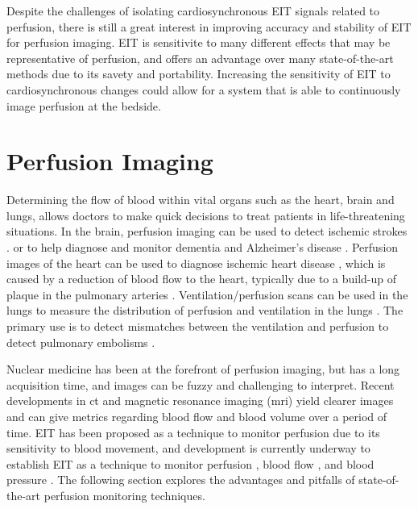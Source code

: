 Despite the challenges of isolating cardiosynchronous EIT signals related to 
perfusion, there is still a great interest in 
improving accuracy and stability of EIT for perfusion imaging.
EIT is sensitivite to many different effects that may be representative of 
perfusion, and offers an advantage over many  
state-of-the-art methods due to its savety and portability. 
Increasing the sensitivity of EIT to cardiosynchronous changes could
allow for a system that is able to 
continuously image perfusion at the bedside.

\section{Perfusion Imaging}

Determining the flow of blood within vital organs such as the heart, brain and lungs, 
allows doctors to make quick decisions to treat patients in life-threatening situations.
In the brain, perfusion imaging can be used to 
detect ischemic strokes 
\parencite{koenig_perfusion_1998,konstas_theoretic_2009}. 
or to help 
diagnose and monitor dementia
and Alzheimer's disease \parencite{dougall_systematic_2004,barker_pathophysiology_2014}.
Perfusion images of the heart can be used to diagnose ischemic 
heart disease \parencite{prvulovich_role_1998}, which is caused by a reduction 
of blood flow to the heart, typically due to 
a build-up of plaque in the pulmonary arteries
\parencite{mendis_global_2011}. Ventilation/perfusion scans can be used in the 
lungs to measure the distribution of perfusion and ventilation in the lungs 
\parencite{mortensen_lung_2019}. The primary use 
is to detect mismatches between the ventilation and perfusion to detect pulmonary 
embolisms \parencite{pioped-investigators_value_1990}.   

Nuclear medicine has been at the forefront of perfusion imaging, but has a long
acquisition time, and images can be fuzzy and 
challenging to interpret. 
Recent developments in \acrfull{ct} and magnetic resonance imaging (\acrshort{mri})
yield clearer images and can give metrics 
regarding blood flow and blood volume over a period of 
time. 
EIT has been proposed as a technique to monitor perfusion due 
to its sensitivity to blood movement, 
and development is currently underway to 
establish EIT as a technique to monitor 
perfusion \parencite{nguyen_review_2012,nguyen_perfusion_2015}, 
blood flow \parencite{braun_limitations_2018,braun_accuracy_2018}, and 
blood pressure \parencite{proenca_noninvasive_2017,proenca_non-invasive_2020}. 
The following section 
explores the advantages and pitfalls of state-of-the-art perfusion monitoring techniques. 


